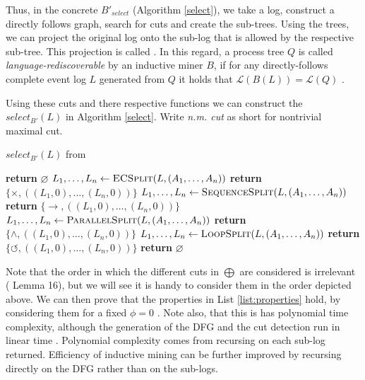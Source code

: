 \documentclass[a4paper]{IEEEtran}
\begin{document}
Thus, in the concrete $B'_{select}$ (Algorithm \ref{select}), we take a log, construct a directly follows graph, search for cuts and create the sub-trees. Using the trees, we can project the original log onto the sub-log that is allowed by the respective sub-tree. This projection is called . In this regard, a process tree $ Q $ is called \textit{language-rediscoverable} by an inductive miner $B$, if for any directly-follows complete event log $L$ generated from $Q$ it holds that $\mathcal{L}(B(L)) = \mathcal{L}(Q)$ \cite{process_mining}.

Using these cuts and there respective  functions we can construct the $select_{B'}(L)$ in Algorithm \ref{select}. Write \textit{n.m. cut} as short for nontrivial maximal cut.

\begin{algorithm}[h!]
\caption{$select_{B'}(L)$ from \cite{inductivemining-constructive}}
\begin{algorithmic}[1]
    \State \textbf{return} $\varnothing$
\EndIf
{}
    \State $L_1, \dots, L_n \gets \Call{ECSplit}{L, (A_1, \dots, A_n)} $
    \State \textbf{return} $\{\times, ((L_1, 0), \dots, (L_n, 0))\}$
\EndIf
{}
    \State $L_1, \dots, L_n \gets \Call{SequenceSplit}{L, (A_1, \dots, A_n)} $
    \State \textbf{return} $\{\rightarrow, ((L_1, 0), \dots, (L_n, 0))\}$
\EndIf
{}
    \State $L_1, \dots, L_n \gets \Call{ParallelSplit}{L, (A_1, \dots, A_n)} $
    \State \textbf{return} $\{\wedge, ((L_1, 0), \dots, (L_n, 0))\}$
\EndIf
{}
    \State $L_1, \dots, L_n \gets \Call{LoopSplit}{L, (A_1, \dots, A_n)} $
    \State \textbf{return} $\{\circlearrowleft, ((L_1, 0), \dots, (L_n, 0))\}$
\EndIf
\State \textbf{return} $\varnothing$
\end{algorithmic}
\label{select}
\end{algorithm}
Note that the order in which the different cuts in $\bigoplus$ are considered is irrelevant (\cite{inductivemining-constructive} Lemma 16), but we will see it is handy to consider them in the order depicted above. We can then prove that the properties in List \ref{list:properties} hold, by considering them for a fixed $\phi = 0$ \cite{inductivemining-constructive}.
Note also, that this is has polynomial time complexity, although the generation of the DFG and the cut detection run in linear time \cite{evermann2016scalable, tarjan1972depth}. Polynomial complexity comes from recursing on each sub-log returned. Efficiency of inductive mining can be further improved by recursing directly on the DFG rather than on the sub-logs.
\end{document}
